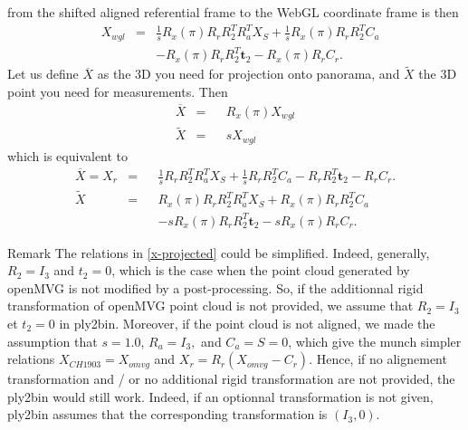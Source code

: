 \documentclass[a4paper, 11pt]{article}
\renewcommand{\tilde}{\widetilde}
\renewcommand{\t}{\mathbf{t}}
\begin{document}
   from the shifted aligned referential frame to the WebGL coordinate frame is then 
   \begin{equation}
       \begin{aligned}
           & X_{wgl} & = & \frac{1}{s} R_x(\pi) R_r R_2^T R_a^T X_S + \frac{1}{s} R_x(\pi) R_r R_2^T C_a \\
            &&&       -R_x(\pi) R_r R_2^T \t_2 - R_x(\pi) R_r C_r.
       \end{aligned}
   \end{equation}  
   Let us define $\overline X $ as the 3D you need for projection onto panorama, and $\tilde X$ the 3D point you need 
   for measurements. Then 
   \begin{equation}
        \begin{aligned}
        \overline X & = && R_x(\pi) X_{wgl} \\
        \tilde X & = && s X_{wgl}
        \end{aligned}
   \end{equation}
   which is equivalent to 
   \begin{equation}
      \label{x-projected}
        \begin{aligned}
        \overline X = X_r & = && \frac{1}{s} R_r R_2^T R_a^T X_S + \frac{1}{s} R_r R_2^T C_a -R_r R_2^T \t_2 - R_r C_r. \\
        \tilde X & = && R_x(\pi) R_r R_2^T R_a^T X_S + R_x(\pi) R_r R_2^T C_a \\
            &&&       -s R_x(\pi) R_r R_2^T \t_2 - s R_x(\pi) R_r C_r.
        \end{aligned}
   \end{equation}
   \begin{paragraph}{Remark}
      The relations in \eqref{x-projected} could be simplified. Indeed, generally, $R_2 = I_3$ and $t_2 = 0$, which is
      the case when the point cloud generated by openMVG is not modified by a post-processing. So, if the additionnal
      rigid transformation of openMVG point cloud is not provided, we assume that $R_2 = I_3$ et $t_2 = 0$ in ply2bin.
      Moreover, if the point cloud is not aligned, we made the assumption that $s=1.0$, $R_a = I_3,$ and $C_a = S = 0$, 
      which give the munch simpler relations $X_{CH1903} = X_{omvg}$ and $X_r = R_r (X_{omvg}-C_r)$.
      Hence, if no alignement transformation and / or no additional rigid transformation are not provided, the ply2bin would
      still work. Indeed, if an optionnal transformation is not given, ply2bin assumes that the corresponding transformation
      is $(I_3, 0)$.
   \end{paragraph}
\end{document}
